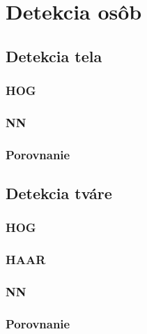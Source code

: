 \chapter{Detekcia osôb}
\label{kap:detection}

\section{Detekcia tela}
\subsection{HOG}
\subsection{NN}
\subsection{Porovnanie}

\section{Detekcia tváre}
\subsection{HOG}
\subsection{HAAR}
\subsection{NN}
\subsection{Porovnanie}